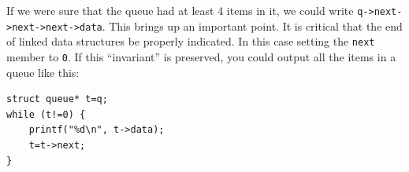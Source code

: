 \begin{center}
\end{center}


If we were sure that the queue had at least 4 items in it, we could write \lstinline!q->next->next->next->data!.
This brings up an important point.
It is critical that the end of linked data structures be properly indicated.
In this case setting the \texttt{next} member to \texttt{0}.
If this ``invariant'' is preserved, you could output all the items in a queue like this:
\begin{lstlisting}
struct queue* t=q;
while (t!=0) {
    printf("%d\n", t->data);
    t=t->next;
}
\end{lstlisting}

